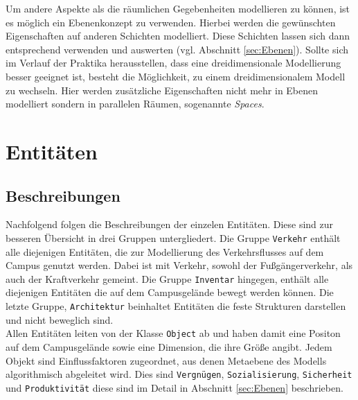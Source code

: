 \documentclass[10pt]{scrartcl}
\begin{document}
        Um andere Aspekte als die räumlichen Gegebenheiten modellieren zu können, ist es möglich ein Ebenenkonzept zu verwenden. Hierbei werden die gewünschten Eigenschaften auf anderen Schichten modelliert. Diese Schichten lassen sich dann entsprechend verwenden und auswerten (vgl. Abschnitt \ref{sec:Ebenen}).
Sollte sich im Verlauf der Praktika herausstellen, dass eine dreidimensionale Modellierung besser geeignet ist, besteht die Möglichkeit, zu einem dreidimensionalem Modell zu wechseln. Hier werden zusätzliche Eigenschaften nicht mehr in Ebenen modelliert sondern in parallelen Räumen, sogenannte \textit{Spaces}.

\section{Entitäten}

	\subsection{Beschreibungen}
	Nachfolgend folgen die Beschreibungen der einzelen Entitäten. Diese sind zur besseren Übersicht in drei Gruppen untergliedert. Die Gruppe \verb!Verkehr! enthält alle diejenigen Entitäten, die zur Modellierung des Verkehrsflusses auf dem Campus genutzt werden. Dabei ist mit Verkehr, sowohl der Fußgängerverkehr, als auch der Kraftverkehr gemeint.
	Die Gruppe \verb!Inventar! hingegen, enthält alle diejenigen Entitäten die auf dem Campusgelände bewegt werden können. Die letzte Gruppe, \verb!Architektur! beinhaltet Entitäten die feste Strukturen darstellen und nicht beweglich sind.\\
	Allen Entitäten leiten von der Klasse \verb!Object! ab und haben damit eine Positon auf dem Campusgelände sowie eine Dimension, die ihre Größe angibt. Jedem Objekt sind Einflussfaktoren zugeordnet, aus denen Metaebene des Modells algorithmisch abgeleitet wird. Dies sind \verb!Vergnügen!,
	\verb!Sozialisierung!, \verb!Sicherheit! und \verb!Produktivität! diese sind im Detail in Abschnitt \ref{sec:Ebenen} beschrieben.
	
\end{document}

